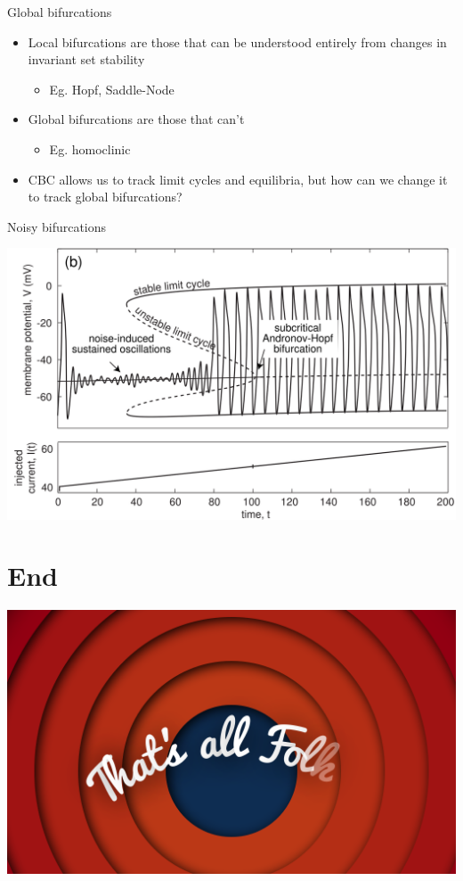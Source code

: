 \documentclass[presentation]{beamer}
\begin{document}
\begin{frame}[label={sec:org7d02e16}]{Global bifurcations}
\begin{itemize}
\item Local bifurcations are those that can be understood entirely from changes in invariant set stability
\begin{itemize}
\item Eg. Hopf, Saddle-Node
\end{itemize}
\item Global bifurcations are those that can't
\begin{itemize}
\item Eg. homoclinic
\end{itemize}
\item CBC allows us to track limit cycles and equilibria, but how can we change it to track global bifurcations?
\end{itemize}
\end{frame}


\begin{frame}[label={sec:orgbe5e618}]{Noisy bifurcations}
\begin{center}
\includegraphics[height=.87\textheight]{./noise.png}
\end{center}
\end{frame}

\section{End}
\label{sec:orga9bf29a}
\begin{frame}[plain,label={sec:org80db03d}]{}
\begin{center}
\includegraphics[width=.9\linewidth]{./end.png}
\end{center}
\end{frame}
\end{document}
